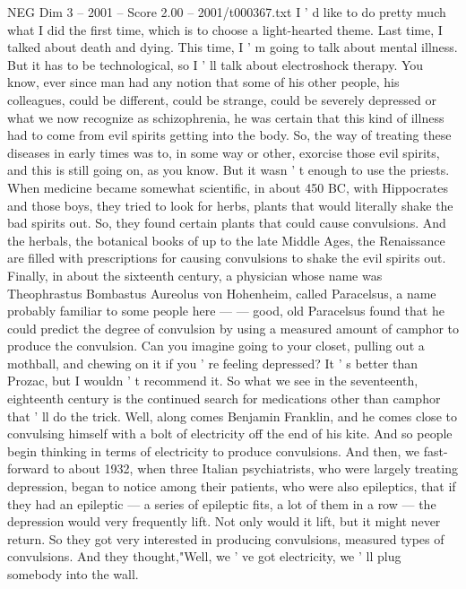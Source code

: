 \begin{textsample}{NEG Dim 3 – 2001 – Score 2.00 – 2001/t000367.txt}  \label{ex:f3_neg_080}
I ' d like to do pretty much what I did the first time, which is to choose a light-hearted theme.
Last time, I talked about death and dying.
This time, I ' m going to talk about mental illness.
But it has to be technological, so I ' ll talk about electroshock therapy.
You know, ever since man had any notion that some of his other people, his colleagues, could be different, could be strange, could be severely depressed or what we now recognize as schizophrenia, he was certain that this kind of illness had to come from evil spirits getting into the body.
So, the way of treating these diseases in early times was to, in some way or other, exorcise those evil spirits, and this is still going on, as you know.
But it wasn ' t enough to use the priests.
When medicine became somewhat scientific, in about 450 BC, with Hippocrates and those boys, they tried to look for herbs, plants that would literally shake the bad spirits out.
So, they found certain plants that could cause convulsions.
And the herbals, the botanical books of up to the late Middle Ages, the Renaissance are filled with prescriptions for causing convulsions to shake the evil spirits out.
Finally, in about the sixteenth century, a physician whose name was Theophrastus Bombastus Aureolus von Hohenheim, called Paracelsus, a name probably familiar to some people here — — good, old Paracelsus found that he could predict the degree of convulsion by using a measured amount of camphor to produce the convulsion.
Can you imagine going to your closet, pulling out a mothball, and chewing on it if you ' re feeling depressed?
It ' s better than Prozac, but I wouldn ' t recommend it.
So what we see in the seventeenth, eighteenth century is the continued search for medications other than camphor that ' ll do the trick.
Well, along comes Benjamin Franklin, and he comes close to convulsing himself with a bolt of electricity off the end of his kite.
And so people begin thinking in terms of electricity to produce convulsions.
And then, we fast-forward to about 1932, when three Italian psychiatrists, who were largely treating depression, began to notice among their patients, who were also epileptics, that if they had an epileptic — a series of epileptic fits, a lot of them in a row — the depression would very frequently lift.
Not only would it lift, but it might never return.
So they got very interested in producing convulsions, measured types of convulsions.
And they thought,"Well, we ' ve got electricity, we ' ll plug somebody into the wall.

\end{textsample}
